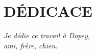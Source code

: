 \chapter*{DÉDICACE}\thispagestyle{headings}
\begin{flushright}
  \itshape
  Je dédie ce travail à Dopey,\\
  ami, frère, chien.
\end{flushright}
